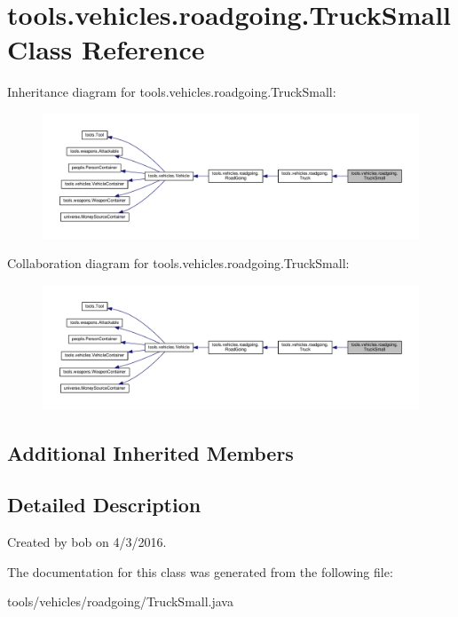 \hypertarget{classtools_1_1vehicles_1_1roadgoing_1_1_truck_small}{}\section{tools.\+vehicles.\+roadgoing.\+Truck\+Small Class Reference}
\label{classtools_1_1vehicles_1_1roadgoing_1_1_truck_small}


Inheritance diagram for tools.\+vehicles.\+roadgoing.\+Truck\+Small\+:\nopagebreak
\begin{figure}[H]
\begin{center}
\leavevmode
\includegraphics[width=350pt]{classtools_1_1vehicles_1_1roadgoing_1_1_truck_small__inherit__graph}
\end{center}
\end{figure}


Collaboration diagram for tools.\+vehicles.\+roadgoing.\+Truck\+Small\+:\nopagebreak
\begin{figure}[H]
\begin{center}
\leavevmode
\includegraphics[width=350pt]{classtools_1_1vehicles_1_1roadgoing_1_1_truck_small__coll__graph}
\end{center}
\end{figure}
\subsection*{Additional Inherited Members}


\subsection{Detailed Description}
Created by bob on 4/3/2016. 

The documentation for this class was generated from the following file\+:\begin{DoxyCompactItemize}
\item 
tools/vehicles/roadgoing/Truck\+Small.\+java\end{DoxyCompactItemize}
